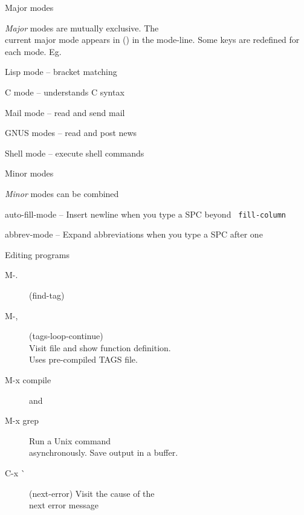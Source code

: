\begin{slide}{}
Major modes

{\em Major} modes are mutually exclusive.  The \\
current major mode
appears in () in the mode-line.  Some keys are redefined for each
mode.  Eg.
\begin{description}
\item Lisp mode -- bracket matching
\item C mode -- understands C syntax
\item Mail mode -- read and send mail
\item GNUS modes -- read and post news
\item Shell mode -- execute shell commands
\end{description}
\end{slide}

\begin{slide}{}
Minor modes

\vspace{3cm}

{\em Minor} modes can be combined
\begin{description}
\item auto-fill-mode -- Insert newline when you type a SPC beyond {\tt
fill-column}
\item abbrev-mode -- Expand abbreviations when you type a SPC after
one
\end{description}
\end{slide}

\begin{slide}{}
Editing programs

\begin{description}
\item[M-.]
(find-tag)
\item[M-,]
(tags-loop-continue) \\
Visit file and show function definition. \\
Uses pre-compiled TAGS file.

\item[M-x compile] and
\item[M-x grep]
Run a Unix command \\
asynchronously.  Save output in a buffer.
\item[C-x \`{}]
(next-error) Visit the cause of the \\
next error message
\end{description}
\end{slide}

